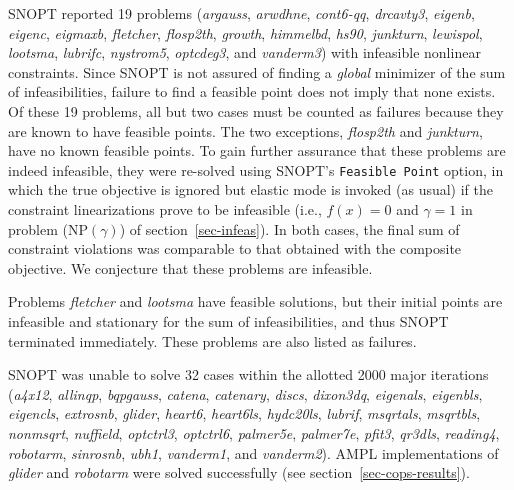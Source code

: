 \documentclass[draft,leqno,onefignum,onetabnum]{siamltex}
\def\NP#1{NP$(#1)$}
\def\v#1{\texttt{#1}}
\def\AMPL  {{\small AMPL}}
\def\SNOPT {{\small SNOPT}}
\def\Cute#1{\hbox{\it\lowercase{#1}\/}}
\begin{document}
 \SNOPT{} reported 19 problems
(\Cute{ARGAUSS},   %
\Cute{ARWDHNE},   %
\Cute{CONT6-QQ},  %
\Cute{DRCAVTY3},  %
\Cute{EIGENB},    %
\Cute{EIGENC},    %
\Cute{EIGMAXB},   %
\Cute{FLETCHER},  %
\Cute{FLOSP2TH},  %
\Cute{GROWTH},    %
\Cute{HIMMELBD},  %
\Cute{HS90},      %
\Cute{JUNKTURN},  %
\Cute{LEWISPOL},  %
{\it loots\-ma},  %
\Cute{LUBRIFC},   %
\Cute{NYSTROM5},  %
\Cute{OPTCDEG3},  %
and
\Cute{VANDERM3})  %
with infeasible nonlinear constraints.  Since \SNOPT{} is not assured
of finding a \emph{global} minimizer of the sum of infeasibilities,
failure to find a feasible point does not imply that none exists.  Of
these 19 problems, all but two cases must be counted as failures
because they are known to have feasible points.  The two exceptions,
\Cute{FLOSP2TH} and \Cute{JUNKTURN}, have no known feasible points. To
gain further assurance that these problems are indeed infeasible, they
were re-solved using \SNOPT's \v{Feasible Point} option, in which the
true objective is ignored but elastic mode is invoked (as usual)
if the constraint linearizations prove to be infeasible (i.e., $f(x) =
0$ and $\gamma = 1$ in problem (\NP{\gamma}) of
section~\ref{sec-infeas}).  In both cases, the final sum of
constraint violations was comparable to that obtained with the
composite objective.  We conjecture that these problems are
infeasible.

Problems \Cute{FLETCHER} and \Cute{LOOTSMA} have feasible solutions,
but their initial points are infeasible and stationary for the sum of
infeasibilities, and thus \SNOPT{} terminated immediately. These
problems are also listed as failures.

 \SNOPT{} was unable to solve 32 cases within the allotted 2000 major
iterations
(\Cute{A4X12},    %
\Cute{ALLINQP},   %
\Cute{BQPGAUSS},  %
\Cute{CATENA},    %
\Cute{CATENARY},  %
\Cute{DISCS},     %
\Cute{DIXON3DQ},  %
\Cute{EIGENALS},  %
\Cute{EIGENBLS},  %
{\it eigen\-cls}, %
\Cute{EXTROSNB},  %
\Cute{GLIDER},    %
\Cute{HEART6},    %
\Cute{HEART6LS},  %
\Cute{HYDC20LS},  %
\Cute{LUBRIF},    %
\Cute{MSQRTALS},  %
\Cute{MSQRTBLS},  %
\Cute{NONMSQRT},  %
\Cute{NUFFIELD},  %
\Cute{OPTCTRL3},  %
\Cute{OPTCTRL6},  %
\Cute{PALMER5E},  %
\Cute{PALMER7E},  %
\Cute{PFIT3},     %
\Cute{QR3DLS},    %
\Cute{READING4},  %
\Cute{ROBOTARM},  %
\Cute{SINROSNB},  %
\Cute{UBH1},      %
\Cute{VANDERM1},  %
and
\Cute{VANDERM2}). %
\AMPL{} implementations of \Cute{GLIDER} and \Cute{ROBOTARM} were
solved successfully (see section~\ref{sec-cops-results}).
\end{document}
